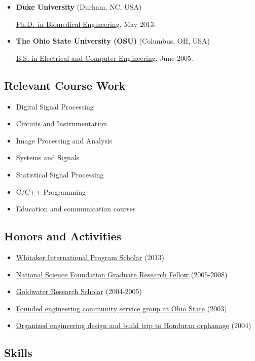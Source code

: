 \documentclass[]{article}
\begin{document}
\begin{itemize}
\item
  \textbf{Duke University} (Durham, NC, USA)

  \href{http://bme.duke.edu/grad}{Ph.D.~in Biomedical Engineering}, May
  2013.
\item
  \textbf{The Ohio State University (OSU)} (Columbus, OH, USA)

  \href{http://ece.osu.edu/futurestudents/undergrad}{B.S. in Electrical
  and Computer Engineering}, June 2005.
\end{itemize}
\subsection{Relevant Course Work}

\begin{itemize}
\item
  Digital Signal Processing
\item
  Circuits and Instrumentation
\item
  Image Processing and Analysis
\item
  Systems and Signals
\item
  Statistical Signal Processing
\item
  C/C++ Programming
\item
  Education and communication courses
\end{itemize}
\subsection{Honors and Activities}

\begin{itemize}
\item
  \href{http://www.whitaker.org/grants/fellows-scholars}{Whitaker
  International Program Scholar} (2013)
\item
  \href{http://www.nsfgrfp.org/}{National Science Foundation Graduate
  Research Fellow} (2005-2008)
\item
  \href{https://goldwater.scholarsapply.org/}{Goldwater Research
  Scholar} (2004-2005)
\item
  \href{http://ecos.osu.edu/}{Founded engineering community service
  group at Ohio State} (2003)
\item
  \href{http://www.montanadeluz.org/}{Organized engineering design and
  build trip to Honduran orphanage} (2004)
\end{itemize}
\subsection{Skills}
\end{document}
